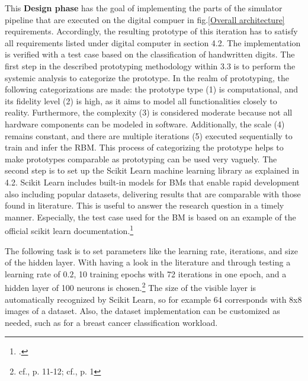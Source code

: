 This \textbf{Design phase} has the goal of implementing the parts of the simulator pipeline that are executed 
on the digital compuer in fig.\ref{Overall architecture} requirements.
Accordingly, the resulting prototype of this iteration has to satisfy all requirements listed under digital computer in section 4.2.
The implementation is verified with a test case based on the classification of handwritten digits.
The first step in the described prototyping methodology within 3.3 is to perform the systemic analysis to categorize the prototype.
In the realm of prototyping, the following categorizations are made: the prototype type (1) is computational, and its fidelity level (2) is high, as it aims to model all functionalities closely to reality.
Furthermore, the complexity (3) is considered moderate because not all hardware components can be modeled in software.
Additionally, the scale (4) remains constant, and there are multiple iterations (5) executed sequentially to train and infer the \ac{RBM}.
This process of categorizing the prototype helps to make prototypes comparable as prototyping can be used very vaguely.
The second step is to set up the Scikit Learn machine learning library as explained in 4.2.
Scikit Learn includes built-in models for \ac{BM}s that enable rapid development also including popular datasets, delivering results that are comparable with those found in literature.
This is useful to answer the research question in a timely manner.
Especially, the test case used for the \ac{BM} is based on an example of the official scikit learn documentation.\footcite[cf.][1]{RestrictedBoltzmannMachine}

The following task is to set parameters like the learning rate, iterations, and size of the hidden layer. 
With having a look in the literature and through testing a learning rate of \(0.2\), 10 training epochs with 72 iterations in one epoch, and a hidden layer of 100 neurons is chosen.\footnote{cf.\cite{hintonPracticalGuideTraining2012}, p. 11-12; cf.\cite{bohmNoiseinjectedAnalogIsing2022}, p. 1}
The size of the visible layer is automatically recognized by Scikit Learn, so for example 64 corresponds with 8x8 images of a dataset.
Also, the dataset implementation can be customized as needed, such as for a breast cancer classification workload.

